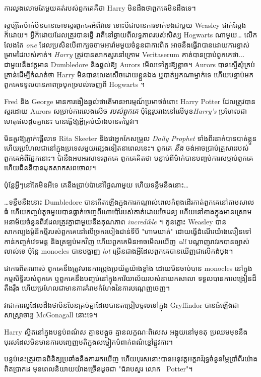 {ការលួងលោមតែមួយគត់របស់ពួកគេគឺថា Harry មិនដឹងថាពួកគេមិនដឹងទេ។

សូម្បីតែម៉ាក់មិនបានចោទសួរពួកគេអំពីវាទេ ទោះបីជាមានការទាក់ទងជាមួយ Weasley ជាក់ស្តែងក៏ដោយ។ អ្វីក៏ដោយដែលត្រូវបានធ្វើ វាគឺនៅឆ្ងាយពីលទ្ធភាពរបស់សិស្ស Hogwarts ណាមួយ… លើកលែងតែ \emph{one} ដែលប្រសិនបើពាក្យចចាមអារ៉ាមមួយចំនួនជាការពិត អាចនឹងធ្វើវាបានដោយការខ្ទាស់ម្រាមដៃរបស់គាត់។ \emph{Harry} ត្រូវបានសាកសួរនៅក្រោម Veritaserum គាត់បានប្រាប់ពួកគេថា... ជាមួយនឹងវត្តមាន Dumbledore និងផ្តល់ឱ្យ Aurors មើលទៅគួរឱ្យខ្លាច។ Aurors បានស្នើសុំគ្រប់គ្រាន់ដើម្បីកំណត់ថា Harry មិនបានលេងសើចដោយខ្លួនឯង ឬបាត់អ្នកណាម្នាក់ទេ ហើយបន្ទាប់មកពួកគេទទួលបានភាពច្របូកច្របល់ចេញពី Hogwarts ។

Fred និង George មានការងឿងឆ្ងល់ថាតើមានអារម្មណ៍ប្រមាថចំពោះ Harry Potter ដែលត្រូវបានសួរដោយ Aurors សម្រាប់ការលេងសើច \emph{របស់ពួកគេ} ប៉ុន្តែរូបរាងនៅលើមុខ\emph{Harry's} ប្រហែលជាហេតុផលដូចគ្នានេះ បានធ្វើឱ្យអ្វីគ្រប់យ៉ាងមានតម្លៃវា។

មិនគួរឱ្យភ្ញាក់ផ្អើលទេ Rita Skeeter និងជាអ្នកកែសម្រួល \emph{Daily Prophet} ទាំងពីរនាក់បានបាត់ខ្លួន ហើយប្រហែលជានៅក្នុងប្រទេសមួយផ្សេងទៀតនាពេលនេះ។ ពួកគេ \emph{នឹង} ចង់អាចប្រាប់គ្រួសាររបស់ពួកគេអំពីផ្នែកនោះ។ ប៉ានឹងអបអរសាទរពួកគេ ពួកគេគិតថា បន្ទាប់ពីម៉ាក់បានបញ្ចប់ការសម្លាប់ពួកគេ ហើយជីននីបានដុតសាកសពចោល។

ប៉ុន្តែអ្វីៗនៅតែមិនអីទេ គេនឹងប្រាប់ប៉ានៅថ្ងៃណាមួយ ហើយទន្ទឹមនឹងនោះ…

…ទន្ទឹមនឹងនោះ Dumbledore បានកើតឡើងក្នុងការកណ្តាស់ពេលកំពុងដើរកាត់ពួកគេនៅតាមសាលធំ ហើយកញ្ចប់តូចមួយបានធ្លាក់ចេញពីហោប៉ៅរបស់គាត់ដោយចៃដន្យ ហើយនៅខាងក្នុងមានស្រោមអនាម័យចំនួនពីរដែលត្រូវគ្នាជាមួយនឹងគុណភាព \emph{incredible} ។ កូនភ្លោះ Weasley បានសាកល្បងម៉ូនីកថ្មីរបស់ពួកគេនៅលើច្រករបៀងជាន់ទីបី "ហាមឃាត់" ដោយធ្វើដំណើរយ៉ាងលឿនទៅកាន់កញ្ចក់វេទមន្ត និងត្រឡប់មកវិញ ហើយពួកគេមិនអាចមើលឃើញ \emph{all} បណ្តាញរាវរកបានច្បាស់លាស់ទេ ប៉ុន្តែ monocles បានបង្ហាញ \emph{lot} ច្រើនជាងអ្វីដែលពួកគេបានឃើញជាលើកដំបូង។

ជាការពិតណាស់ ពួកគេនឹងត្រូវមានការប្រុងប្រយ័ត្នយ៉ាងខ្លាំង ដោយមិនចាប់បាន monocles នៅក្នុងកម្មសិទ្ធិរបស់ពួកគេ ឬពួកគេនឹងបញ្ចប់នៅក្នុងការិយាល័យរបស់នាយកសាលា ទទួលបានការបង្រៀនដ៏តឹងរ៉ឹង ហើយប្រហែលជាមានការគំរាមកំហែងនៃការបណ្តេញចេញ។

វាជាការល្អដែលដឹងថាមិនមែនគ្រប់គ្នាដែលបានតម្រៀបចូលទៅក្នុង Gryffindor បានធំឡើងជាសាស្រ្តាចារ្យ McGonagall នោះទេ។

\later

Harry ស្ថិតនៅក្នុងបន្ទប់ពណ៌ស គ្មានបង្អួច គ្មានលក្ខណៈពិសេស អង្គុយនៅមុខតុ ប្រឈមមុខនឹងបុរសដែលមិនមានការបញ្ចេញមតិក្នុងសម្លៀកបំពាក់ពណ៌ខ្មៅផ្លូវការ។

បន្ទប់នេះត្រូវបានពិនិត្យប្រឆាំងនឹងការរកឃើញ ហើយបុរសនោះបានអនុវត្តអក្ខរាវិរុទ្ធចំនួនម្ភៃប្រាំពីរយ៉ាងពិតប្រាកដ មុនពេលនិយាយយ៉ាងច្រើនដូចជា "ជំរាបសួរ លោក~ Potter"។

}
